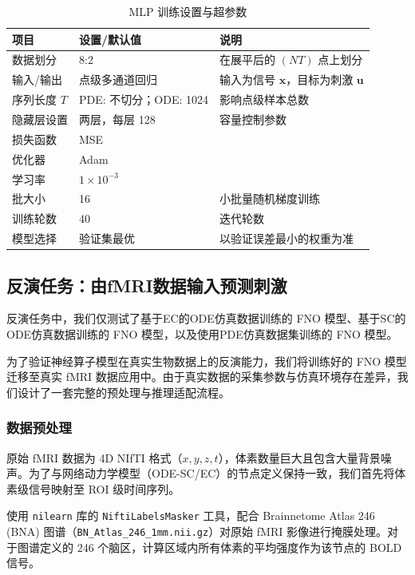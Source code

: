 \documentclass[12pt,a4paper]{article}
\begin{document}
\begin{table}[h]
\centering
\caption{MLP 训练设置与超参数}
\begin{tabular}{@{}lll@{}}
\toprule
项目 & 设置/默认值 & 说明 \\ \midrule
数据划分 & 8:2 & 在展平后的 $(NT)$ 点上划分 \\
输入/输出 & 点级多通道回归 & 输入为信号 $\mathbf{x}$，目标为刺激 $\mathbf{u}$ \\
序列长度 $T$ & PDE: 不切分；ODE: 1024 & 影响点级样本总数 \\
隐藏层设置 & 两层，每层 128 & 容量控制参数 \\
损失函数 & MSE &  \\
优化器 & Adam &  \\
学习率 & $1\times10^{-3}$ &  \\
批大小 & 16 & 小批量随机梯度训练 \\
训练轮数 & 40 & 迭代轮数 \\
模型选择 & 验证集最优 & 以验证误差最小的权重为准 \\
\bottomrule
\end{tabular}
\end{table}



\subsection{反演任务：由fMRI数据输入预测刺激}
反演任务中，我们仅测试了基于EC的ODE仿真数据训练的 FNO 模型、基于SC的ODE仿真数据训练的 FNO 模型，以及使用PDE仿真数据集训练的 FNO 模型。

为了验证神经算子模型在真实生物数据上的反演能力，我们将训练好的 FNO 模型迁移至真实 fMRI 数据应用中。由于真实数据的采集参数与仿真环境存在差异，我们设计了一套完整的预处理与推理适配流程。

\subsubsection{数据预处理}

原始 fMRI 数据为 4D NIfTI 格式（$x, y, z, t$），体素数量巨大且包含大量背景噪声。为了与网络动力学模型（ODE-SC/EC）的节点定义保持一致，我们首先将体素级信号映射至 ROI 级时间序列。

使用 \texttt{nilearn} 库的 \texttt{NiftiLabelsMasker} 工具，配合 Brainnetome Atlas 246 (BNA) 图谱（\texttt{BN\_Atlas\_246\_1mm.nii.gz}）对原始 fMRI 影像进行掩膜处理。对于图谱定义的 246 个脑区，计算区域内所有体素的平均强度作为该节点的 BOLD 信号。
\end{document}
